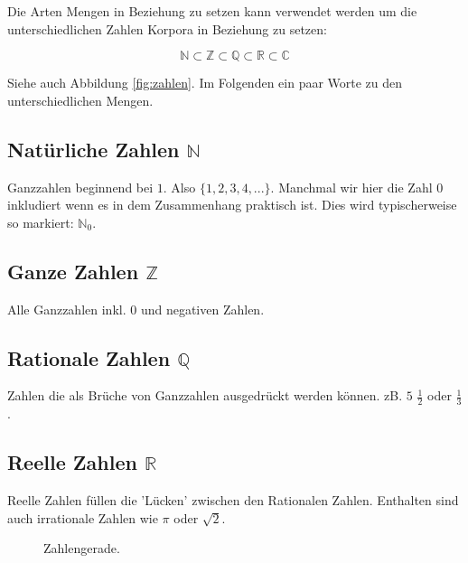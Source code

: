 Die Arten Mengen in Beziehung zu setzen kann verwendet werden um die unterschiedlichen Zahlen Korpora in Beziehung zu setzen:

$$
\mathbb{N} \subset \mathbb{Z} \subset \mathbb{Q} \subset \mathbb{R} \subset \mathbb{C}
 $$

Siehe auch Abbildung \ref{fig:zahlen}. Im Folgenden ein paar Worte zu den unterschiedlichen Mengen.



\subsection{Natürliche Zahlen $\mathbb{N}$}
Ganzzahlen beginnend bei $1$. Also $\{1,2,3,4,...\}$. Manchmal wir hier die Zahl $0$ inkludiert wenn es in dem Zusammenhang praktisch ist. Dies wird typischerweise so markiert: $\mathbb{N}_0$.  
\subsection{Ganze Zahlen $\mathbb{Z}$}
Alle Ganzzahlen inkl. $0$ und negativen Zahlen.
\subsection{Rationale Zahlen $\mathbb{Q}$}
Zahlen die als Brüche von Ganzzahlen ausgedrückt werden können. zB. $5$ $\frac{1}{2}$ oder $\frac{1}{3}$.

\subsection{Reelle Zahlen $\mathbb{R}$}
Reelle Zahlen füllen die 'Lücken' zwischen den Rationalen Zahlen. Enthalten sind auch irrationale Zahlen wie $\pi$ oder $\sqrt{2}$.



\begin{figure}[h!]
    \centering
    

    \caption{Zahlengerade.}
    \label{fig:zahlengerade}
\end{figure}


